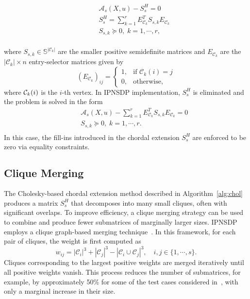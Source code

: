 \documentclass[]{interact}
\theoremstyle{plain}%
\theoremstyle{definition}
\theoremstyle{remark}
\begin{document}
\begin{equation}
\begin{aligned}
\label{eq:mlPrimal3_a}
& & & \mathcal{A}_s(X,u) - S^H_s= 0 \\
& & & S^H_s = \sum_{k=1}^r E_{\mathcal{C}_k}^T S_{s,k} E_{\mathcal{C}_k}\\
& & & S_{s,k} \succeq 0,\; k = 1,\cdots,r, \\
\end{aligned}
\end{equation}

where $S_{s,k} \in \mathbb{S}^{|\mathcal{C}_k|}$ are the smaller positive semidefinite matrices and $E_{\mathcal{C}_k}$ are the $|\mathcal{C}_k| \times n$ entry-selector matrices given by
\begin{equation}
\label{eq:entry_selector}
(E_{\mathcal{C}_k})_{ij} = \begin{cases}
1, & \text{if } \mathcal{C}_k(i) = j \\
0, & \text{otherwise},
\end{cases}
\end{equation}
where $ {\cal C}_k (i)$ is the $i$-th vertex.
In IPNSDP implementation, $S^H_s$ is eliminated and the problem is solved in the form
\begin{equation}
\begin{aligned}
\label{eq:mlPrimal3_b}
& & & \mathcal{A}_s(X,u) - \sum_{k=1}^r E_{\mathcal{C}_k}^T S_{s,k} E_{\mathcal{C}_k}= 0 \\
& & & S_{s,k} \succeq 0,\; k = 1,\cdots,r. \\
\end{aligned}
\end{equation}
In this case, the fill-ins introduced in the chordal extension $S^H_s$ are enforced to be zero via equality constraints.

\subsection{Clique Merging}
\label{sec:cmerge}
The Cholesky-based chordal extension method described in Algorithm~\ref{alg:chol} produces a matrix $S^H_s$ that decomposes into many small cliques, often with significant overlaps. To improve efficiency, a clique merging strategy can be used to combine and produce fewer submatrices of marginally larger sizes. IPNSDP employs a clique graph-based merging technique~\cite{GARSTKA2020}. In this framework, for each pair of cliques, the weight is first computed as
\[
w_{ij} = |\mathcal{C}_i|^3 + |\mathcal{C}_j|^3 - |\mathcal{C}_i \cup \mathcal{C}_j|^3, \quad i,j \in \{1,\cdots,s\}.
\]
Cliques corresponding to the largest positive weights are merged iteratively until all positive weights vanish. This process reduces the number of submatrices, for example, by approximately 50\% for some of the test cases considered in~\cite{Weldeyesus2024}, with only a marginal increase in their size.
\end{document}

